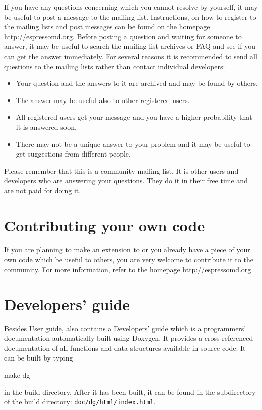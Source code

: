 If you have any questions concerning \es which you cannot
resolve by yourself, it may be useful to post a message to
the mailing list. Instructions, on how to register to the mailing
lists and post messages can be found on the homepage 
\url{http://espressomd.org}.
Before posting a question and waiting for someone to answer, 
it may be useful to search the mailing list archives or FAQ and 
see if you can get the answer immediately.
For several reasons it is recommended to send all questions 
to the mailing lists rather than contact individual developers:
\begin{itemize}
  \item Your question and the answers to it are archived and may 
  be found by others.
  \item The answer may be useful also to other registered users.
  \item All registered users get your message and you have a higher 
  probability that it is answered soon.
  \item There may not be a unique answer to your problem and it may 
  be useful to get suggestions from different people.
\end{itemize}

Please remember that this is a community mailing list. It is other
users and developers who are answering your questions. They do it
in their free time and are not paid for doing it.


\section{Contributing your own code}

If you are planning to make an extension to \es or you 
already have a piece of your own code which be useful 
to others, you are very welcome to contribute it to 
the community.
For more information, refer to the homepage \url{http://espressomd.org}

\section{Developers' guide}

Besides User guide, \es also contains a Developers' guide
which is a programmers' documentation automatically built 
using Doxygen. It provides a cross-referenced documentation
of all functions and data structures available in \es source
code. It can be built by typing
\begin{code}
  make dg
\end{code}
in the build directory. After it has been built, it can be found
in the subdirectory of the build directory: \texttt{doc/dg/html/index.html}.

